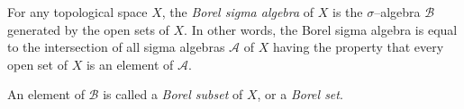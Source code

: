 \documentclass[12pt]{article}
\begin{document}
For any topological space $X$, the \emph{Borel sigma algebra} of $X$ is the $\sigma$--algebra $\mathcal{B}$ generated by the open sets of $X$. In other words, the Borel sigma algebra is equal to the intersection of all sigma algebras $\mathcal{A}$ of $X$ having the property that every open set of $X$ is an element of $\mathcal{A}$.

An element of $\mathcal{B}$ is called a \emph{Borel subset} of $X$, or a \emph{Borel set}.


\end{document}
